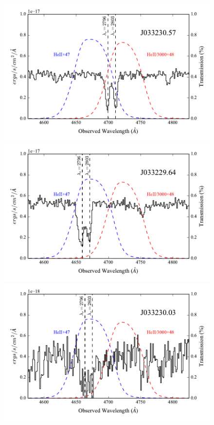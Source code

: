 \documentclass[twocolumn]{aastex61}
\begin{document}
\begin{figure}[!htb]
\centering
\includegraphics[scale=0.58]{../Figures/filt_57_spectra.pdf}
\includegraphics[scale=0.58]{../Figures/filt_64_spectra.pdf}
\includegraphics[scale=0.58]{../Figures/filt_03_spectra.pdf}

\end{figure}
\end{document}
